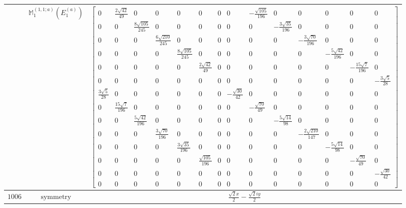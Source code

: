 \documentclass[fleqn,8pt,landscape]{jsarticle}
\begin{document}
\begin{longtable}{ccc}
$  $ & $ \mathbb{M}_{1}^{(1,1;a)}(E_{1}^{(a)}) $ & $ \begin{bmatrix} 0 & \frac{2 \sqrt{42}}{49} & 0 & 0 & 0 & 0 & 0 & 0 & - \frac{\sqrt{105}}{196} & 0 & 0 & 0 & 0 & 0 \\ 0 & 0 & \frac{8 \sqrt{105}}{245} & 0 & 0 & 0 & 0 & 0 & 0 & - \frac{3 \sqrt{35}}{196} & 0 & 0 & 0 & 0 \\ 0 & 0 & 0 & \frac{6 \sqrt{210}}{245} & 0 & 0 & 0 & 0 & 0 & 0 & - \frac{3 \sqrt{70}}{196} & 0 & 0 & 0 \\ 0 & 0 & 0 & 0 & \frac{8 \sqrt{105}}{245} & 0 & 0 & 0 & 0 & 0 & 0 & - \frac{5 \sqrt{42}}{196} & 0 & 0 \\ 0 & 0 & 0 & 0 & 0 & \frac{2 \sqrt{42}}{49} & 0 & 0 & 0 & 0 & 0 & 0 & - \frac{15 \sqrt{7}}{196} & 0 \\ 0 & 0 & 0 & 0 & 0 & 0 & 0 & 0 & 0 & 0 & 0 & 0 & 0 & - \frac{3 \sqrt{5}}{28} \\ \frac{3 \sqrt{5}}{28} & 0 & 0 & 0 & 0 & 0 & 0 & - \frac{\sqrt{30}}{42} & 0 & 0 & 0 & 0 & 0 & 0 \\ 0 & \frac{15 \sqrt{7}}{196} & 0 & 0 & 0 & 0 & 0 & 0 & - \frac{\sqrt{70}}{49} & 0 & 0 & 0 & 0 & 0 \\ 0 & 0 & \frac{5 \sqrt{42}}{196} & 0 & 0 & 0 & 0 & 0 & 0 & - \frac{5 \sqrt{14}}{98} & 0 & 0 & 0 & 0 \\ 0 & 0 & 0 & \frac{3 \sqrt{70}}{196} & 0 & 0 & 0 & 0 & 0 & 0 & - \frac{2 \sqrt{210}}{147} & 0 & 0 & 0 \\ 0 & 0 & 0 & 0 & \frac{3 \sqrt{35}}{196} & 0 & 0 & 0 & 0 & 0 & 0 & - \frac{5 \sqrt{14}}{98} & 0 & 0 \\ 0 & 0 & 0 & 0 & 0 & \frac{\sqrt{105}}{196} & 0 & 0 & 0 & 0 & 0 & 0 & - \frac{\sqrt{70}}{49} & 0 \\ 0 & 0 & 0 & 0 & 0 & 0 & 0 & 0 & 0 & 0 & 0 & 0 & 0 & - \frac{\sqrt{30}}{42} \\ 0 & 0 & 0 & 0 & 0 & 0 & 0 & 0 & 0 & 0 & 0 & 0 & 0 & 0 \end{bmatrix} $ \\ \hline
$ 1006 $ & $ \text{symmetry} $ & $ \frac{\sqrt{2} x}{2} - \frac{\sqrt{2} i y}{2} $ \\

\end{longtable}
\end{document}
